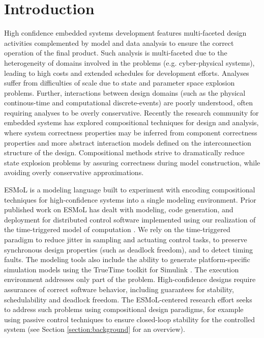 \section{Introduction}

High confidence embedded systems development features multi-faceted design activities
complemented by model and data analysis to ensure the correct operation of the final
product.  Such analysis is multi-faceted due to the heterogeneity of domains 
involved in the problems (e.g. cyber-physical systems), leading to high costs and
extended schedules for development efforts.  Analyses suffer from difficulties
of scale due to state and parameter space explosion problems.  Further, interactions
between design domains (such as the physical continous-time and computational 
discrete-events) are poorly understood, often requiring analyses to be overly conservative.
Recently the research community for embedded systems has explored 
compositional techniques for design and analysis, where system correctness properties
may be inferred from component correctness properties and more abstract interaction 
models defined on the interconnection structure of the design.  Compositional methods
strive to dramatically reduce state explosion problems by assuring correctness during
model construction, while avoiding overly conservative approximations.

ESMoL is a modeling language built to experiment with encoding compositional 
techniques for high-confidence systems into a single modeling environment.  Prior 
published work on ESMoL has dealt with modeling, code generation, and deployment for distributed 
control software implemented using our realization of the time-triggered model of computation
\cite{timed:frodo, modeling:aces08, sched:analysis}. We rely on the time-triggered paradigm to 
reduce jitter in sampling and actuating control tasks, to preserve synchronous design properties 
(such as deadlock freedom), and to detect timing faults\cite{timed:tta}. The modeling tools also 
include the ability to generate platform-specific simulation models using the TrueTime toolkit for 
Simulink \cite{modeling:truetime,tools:truetime}. The execution environment addresses only part of 
the problem.  High-confidence designs require assurances of correct software behavior, including 
guarantees for stability, schedulability and deadlock freedom.  The ESMoL-centered research effort 
seeks to address such problems using compositional design paradigms, for example using passive 
control techniques to ensure closed-loop stability for the controlled system (see Section 
\ref{section:background} for an overview).

